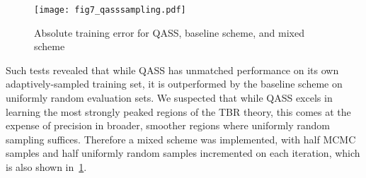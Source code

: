 \begin{figure}[h]
  \centering
    \texttt{[image: fig7\_qasssampling.pdf]}
    \caption{Absolute training error for QASS, baseline scheme, and mixed scheme}
  \label{fig:qasssampling}
\end{figure}

Such tests revealed that while QASS has unmatched performance on its own
adaptively-sampled training set, it is outperformed by the baseline scheme on
uniformly random evaluation sets. We suspected that while QASS excels in
learning the most strongly peaked regions of the TBR theory, this comes at the
expense of precision in broader, smoother regions where uniformly random
sampling suffices. Therefore a mixed scheme was implemented, with half MCMC
samples and half uniformly random samples incremented on each iteration, which
is also shown in~\cref{fig:qasssampling}.

